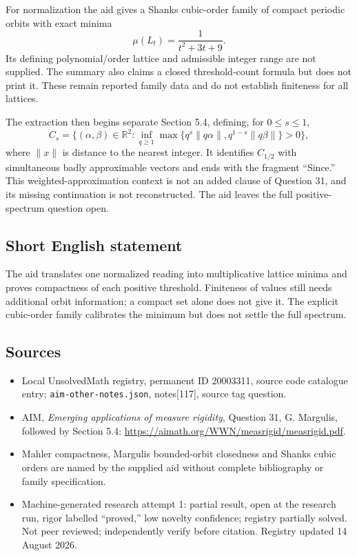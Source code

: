 \documentclass[11pt]{article}
\newcommand{\R}{\mathbb{R}}
\begin{document}
For normalization the aid gives a Shanks cubic-order family of compact periodic orbits with exact minima
\[
 \mu(L_t)=\frac1{t^2+3t+9}.
\]
Its defining polynomial/order lattice and admissible integer range are not supplied. The summary also claims a closed threshold-count formula but does not print it. These remain reported family data and do not establish finiteness for all lattices.

The extraction then begins separate Section 5.4, defining, for $0\leq s\leq1$,
\[
 C_s=\{(\alpha,\beta)\in\R^2:
 \inf_{q\geq1}\max\{q^s\|q\alpha\|,
 q^{1-s}\|q\beta\|\}>0\},
\]
where $\|x\|$ is distance to the nearest integer. It identifies $C_{1/2}$ with simultaneous badly approximable vectors and ends with the fragment ``Since.'' This weighted-approximation context is not an added clause of Question 31, and its missing continuation is not reconstructed. The aid leaves the full positive-spectrum question open.
\subsection{Short English statement}
The aid translates one normalized reading into multiplicative lattice minima and proves compactness of each positive threshold. Finiteness of values still needs additional orbit information; a compact set alone does not give it. The explicit cubic-order family calibrates the minimum but does not settle the full spectrum.
\subsection{Sources}
\begin{itemize}
\item Local UnsolvedMath registry, permanent ID 20003311, source code catalogue entry; \texttt{aim-other-notes.json}, notes[117], source tag question.
\item AIM, \emph{Emerging applications of measure rigidity}, Question 31, G. Margulis, followed by Section 5.4: \url{https://aimath.org/WWN/measrigid/measrigid.pdf}.
\item Mahler compactness, Margulis bounded-orbit closedness and Shanks cubic orders are named by the supplied aid without complete bibliography or family specification.
\item Machine-generated research attempt 1: partial result, open at the research run, rigor labelled ``proved,'' low novelty confidence; registry partially solved. Not peer reviewed; independently verify before citation. Registry updated 14 August 2026.
\end{itemize}
\end{document}

